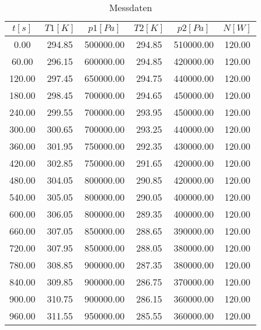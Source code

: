 
\begin{table}
    \centering
    \caption{Messdaten}
    \label{tab:Messdaten}
    \begin{tabular}{c c c c c c}
        \toprule
        {$t [s]$} & {$T1 [K]$} & {$p1 [Pa]$} & {$T2 [K]$} & {$p2 [Pa]$} & {$N [W]$} \\
        \midrule
        0.00   &      294.85  &   500000.00  &      294.85  &   510000.00  &      120.00 \\
        60.00  &      296.15  &   600000.00  &      294.85  &   420000.00  &      120.00\\
       120.00  &      297.45  &   650000.00  &      294.75  &   440000.00  &      120.00\\
       180.00  &      298.45  &   700000.00  &      294.65  &   450000.00  &      120.00\\
       240.00  &      299.55  &   700000.00  &      293.95  &   450000.00  &      120.00\\
       300.00  &      300.65  &   700000.00  &      293.25  &   440000.00  &      120.00\\
       360.00  &      301.95  &   750000.00  &      292.35  &   430000.00  &      120.00\\
       420.00  &      302.85  &   750000.00  &      291.65  &   420000.00  &      120.00\\
       480.00  &      304.05  &   800000.00  &      290.85  &   420000.00  &      120.00\\
       540.00  &      305.05  &   800000.00  &      290.05  &   400000.00  &      120.00\\
       600.00  &      306.05  &   800000.00  &      289.35  &   400000.00  &      120.00\\
       660.00  &      307.05  &   850000.00  &      288.65  &   390000.00  &      120.00\\
       720.00  &      307.95  &   850000.00  &      288.05  &   380000.00  &      120.00\\
       780.00  &      308.85  &   900000.00  &      287.35  &   380000.00  &      120.00\\
       840.00  &      309.85  &   900000.00  &      286.75  &   370000.00  &      120.00\\
       900.00  &      310.75  &   900000.00  &      286.15  &   360000.00  &      120.00\\
       960.00  &      311.55  &   950000.00  &      285.55  &   360000.00  &      120.00\\

\end{tabular}
\end{table}
